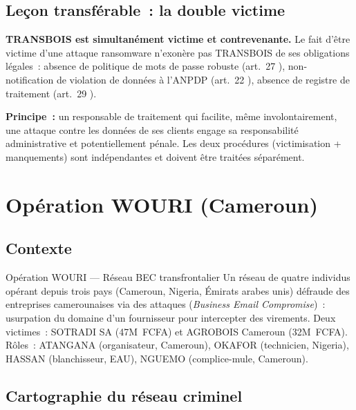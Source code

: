 \subsection{Leçon transférable~: la double victime}

\begin{boxalert}
\textbf{TRANSBOIS est simultanément victime et contrevenante.} Le fait
d'être victime d'une attaque ransomware n'exonère pas TRANSBOIS de ses
obligations légales~: absence de politique de mots de passe robuste (art.~27
), non-notification de violation de données à l'ANPDP
(art.~22 ), absence de registre de traitement (art.~29
).

\textbf{Principe~:} un responsable de traitement qui facilite, même
involontairement, une attaque contre les données de ses clients engage
sa responsabilité administrative et potentiellement pénale. Les deux
procédures (victimisation + manquements) sont indépendantes et doivent
être traitées séparément.
\end{boxalert}

\section{Opération WOURI (Cameroun)}
\label{sec:wouri}

\subsection{Contexte}

\begin{boxscenario}{Opération WOURI --- Réseau BEC transfrontalier}
Un réseau de quatre individus opérant depuis trois pays (Cameroun,
Nigeria, Émirats arabes unis) défraude des entreprises camerounaises via des
attaques  (\textit{Business Email Compromise})~: usurpation
du domaine d'un fournisseur pour intercepter des virements. Deux victimes~:
SOTRADI SA (47M~FCFA) et AGROBOIS Cameroun (32M~FCFA). Rôles~:
ATANGANA (organisateur, Cameroun), OKAFOR (technicien, Nigeria),
HASSAN (blanchisseur, EAU), NGUEMO (complice-mule, Cameroun).
\end{boxscenario}

\subsection{Cartographie du réseau criminel}

